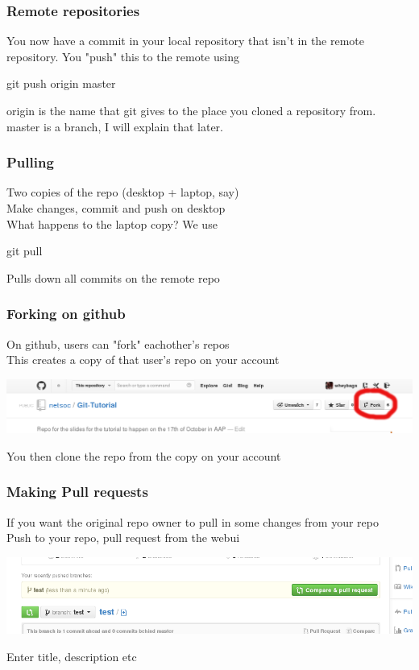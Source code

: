 \documentclass[xcolor=dvipsnames]{beamer}
\begin{document}
\begin{frame}
    \frametitle{Remote repositories}

    You now have a commit in your local repository that isn't in the remote repository.
    You "push" this to the remote using
    \begin{block}{}
        git push origin master
    \end{block}
    
    origin is the name that git gives to the place you cloned a repository from.\\
    master is a branch, I will explain that later.

\end{frame}

\begin{frame}
    \frametitle{Pulling}

    Two copies of the repo (desktop + laptop, say)\\
    Make changes, commit and push on desktop\\\vbox{}
    What happens to the laptop copy? We use
    \begin{block}{}
        git pull
    \end{block}
    Pulls down all commits on the remote repo
\end{frame}

\begin{frame}
    \frametitle{Forking on github}

    On github, users can "fork" eachother's repos\\
    This creates a copy of that user's repo on your account\\

    \begin{center}
        \includegraphics[scale=0.3]{gh-fork.png}
    \end{center}

    You then clone the repo from the copy on your account
\end{frame}

\begin{frame}
    \frametitle{Making Pull requests}

    If you want the original repo owner to pull in some changes from your repo\\
    Push to your repo, pull request from the webui

    \begin{center}
        \includegraphics[scale=0.4]{gh-pullrequest.png}
    \end{center}

    Enter title, description etc
\end{frame}
\end{document}
